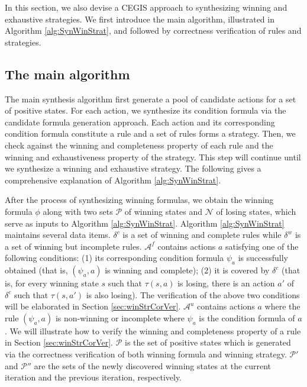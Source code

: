 \documentclass[review]{elsarticle}
\newcommand{\positiveSet}{\mathcal{P}}
\newcommand{\negativeSet}{\mathcal{N}}
\newcommand{\act}{\mathcal{A}}
\newcommand{\suc}{\tau}
\begin{document}
In this section, we also devise a CEGIS approach to synthesizing winning and exhaustive strategies.
We first introduce the main algorithm, illustrated in Algorithm \ref{alg:SynWinStrat}, and followed by correctness verification of rules and strategies.


\subsection{The main algorithm}
The main synthesis algorithm first generate a pool of candidate actions for a set of positive states.
For each action, we synthesize its condition formula via the candidate formula generation approach.
Each action and its corresponding condition formula constitute a rule and a set of rules forms a strategy.
Then, we check against the winning and completeness property of each rule and the winning and exhaustiveness property of the strategy.
This step will continue until we synthesize a winning and exhaustive strategy. %
The following gives a comprehensive explanation of Algorithm \ref{alg:SynWinStrat}.

After the process of synthesizing winning formulas, we obtain the winning formula $\phi$ along with two sets $\positiveSet$ of winning states and $\negativeSet$ of losing states, which serve as inputs to Algorithm \ref{alg:SynWinStrat}.
Algorithm \ref{alg:SynWinStrat} maintains several data items.
$\delta^c$ is a set of winning and complete rules while $\delta^w$ is a set of winning but incomplete rules.
$\act^f$ contains actions $a$ satisfying one of the following conditions:
(1) its corresponding condition formula $\psi_a$ is successfully obtained (that is, $(\psi_a, a)$ is winning and complete);
(2) it is covered by $\delta^c$ (that is, for every winning state $s$ such that $\suc(s, a)$ is losing, there is an action $a'$ of $\delta^c$ such that $\suc(s, a')$ is also losing).
The verification of the above two conditions will be elaborated in Section \ref{sec:winStrCorVer}.
$\act^u$ contains actions $a$ where the rule $(\psi_a, a)$ is non-winning or incomplete where $\psi_a$ is the condition formula of $a$.
We will illustrate how to verify the winning and completeness property of a rule in Section \ref{sec:winStrCorVer}.
$\positiveSet$ is the set of positive states which is generated via the correctness verification of both winning formula and winning strategy.
$\positiveSet'$ and $\positiveSet''$ are the sets of the newly discovered winning states at the current iteration and the previous iteration, respectively.
\end{document}

